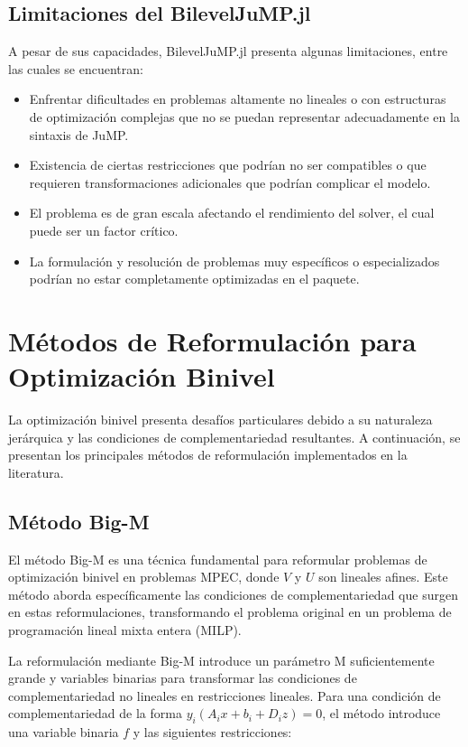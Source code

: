 \subsection{Limitaciones del BilevelJuMP.jl}

A pesar de sus capacidades, BilevelJuMP.jl presenta algunas limitaciones, entre las cuales se encuentran:

\begin{itemize}
    \item Enfrentar dificultades en problemas altamente no lineales o con estructuras de optimización complejas que no se puedan representar adecuadamente en la sintaxis de JuMP.
    \item Existencia de ciertas restricciones que podrían no ser compatibles o que requieren transformaciones adicionales que podrían complicar el modelo.
    \item El problema es de gran escala afectando el rendimiento del solver, el cual puede ser un factor crítico.
    \item La formulación y resolución de problemas muy específicos o especializados podrían no estar completamente optimizadas en el paquete.
\end{itemize}


\section{Métodos de Reformulación para Optimización Binivel}

La optimización binivel presenta desafíos particulares debido a su naturaleza jerárquica y las condiciones de complementariedad resultantes. A continuación, se presentan los principales métodos de reformulación implementados en la literatura.

\subsection{Método Big-M}

El método Big-M es una técnica fundamental para reformular problemas de optimización binivel en problemas MPEC, donde $V$ y $U$ son lineales afines. Este método aborda específicamente las condiciones de complementariedad que surgen en estas reformulaciones, transformando el problema original en un problema de programación lineal mixta entera (MILP).

La reformulación mediante Big-M introduce un parámetro M suficientemente grande y variables binarias para transformar las condiciones de complementariedad no lineales en restricciones lineales. Para una condición de complementariedad de la forma $y_i(A_ix + b_i + D_iz) = 0$, el método introduce una variable binaria $f$ y las siguientes restricciones:

